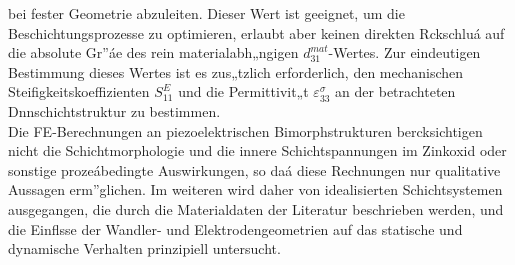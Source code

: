 bei fester Geometrie abzuleiten.
Dieser Wert ist geeignet, um die Beschichtungsprozesse zu optimieren,
erlaubt aber keinen direkten Rckschluá auf die absolute Gr”áe des rein
materialabh„ngigen $d^{mat}_{31}$-Wertes. Zur eindeutigen Bestimmung dieses
Wertes ist es zus„tzlich erforderlich, den mechanischen
Steifigkeitskoeffizienten $S^{E}_{11}$ und die Permittivit„t
$\varepsilon^{\sigma}_{33}$ an der betrachteten Dnnschichtstruktur zu
bestimmen.\\
%
Die FE-Berechnungen an piezoelektrischen Bimorphstrukturen bercksichtigen
nicht die Schichtmorphologie und die innere Schichtspannungen im Zinkoxid
oder sonstige prozeábedingte Auswirkungen, so daá diese Rechnungen nur
qualitative Aussagen erm”glichen. Im weiteren wird daher von idealisierten
Schichtsystemen ausgegangen, die durch die Materialdaten der Literatur
beschrieben werden, und die Einflsse der Wandler- und Elektrodengeometrien
auf das statische und dynamische Verhalten prinzipiell untersucht.
